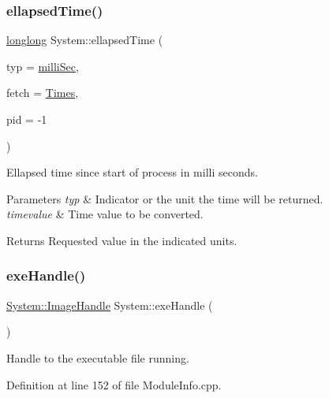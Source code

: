 \subsubsection{\texorpdfstring{ellapsed\+Time()}{ellapsedTime()}}
{\footnotesize\ttfamily \hyperlink{Kernel_8h_a2e10ca87f14998150dd86073beff4e97}{longlong} System\+::ellapsed\+Time (\begin{DoxyParamCaption}\item[{\hyperlink{namespaceSystem_a15db094516c062b412df2453b4350f1a}{Time\+Type}}]{typ = {\ttfamily \hyperlink{namespaceSystem_a15db094516c062b412df2453b4350f1aa1b7bae23a29567151c8b8103104c620a}{milli\+Sec}},  }\item[{\hyperlink{namespaceSystem_a71a46d52920ca8e98fc4649949be58a7}{Info\+Type}}]{fetch = {\ttfamily \hyperlink{namespaceSystem_a71a46d52920ca8e98fc4649949be58a7a3f922834570db4b74edefd683ee0424b}{Times}},  }\item[{long}]{pid = {\ttfamily -\/1} }\end{DoxyParamCaption})}

Ellapsed time since start of process in milli seconds. 
\begin{DoxyParams}{Parameters}
{\em typ} & Indicator or the unit the time will be returned. \\
\hline
{\em timevalue} & Time value to be converted. \\
\hline
\end{DoxyParams}
\begin{DoxyReturn}{Returns}
Requested value in the indicated units. 
\end{DoxyReturn}
\mbox{\label{namespaceSystem_a89399871d8d0f573f39f97f7f4a6320b}} 
\subsubsection{\texorpdfstring{exe\+Handle()}{exeHandle()}}
{\footnotesize\ttfamily \hyperlink{namespaceSystem_a21dca3f6170a2b0a0ea3028040ba21b3}{System\+::\+Image\+Handle} System\+::exe\+Handle (\begin{DoxyParamCaption}{ }\end{DoxyParamCaption})}



Handle to the executable file running. 



Definition at line 152 of file Module\+Info.\+cpp.



